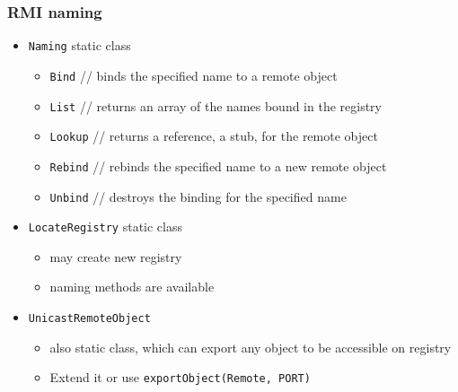 \documentclass[10pt,xcolor=pdflatex]{beamer}
\begin{document}
\begin{frame}[containsverbatim]\frametitle{RMI naming}
\begin{itemize}
	\item \texttt{Naming} static class
	  \begin{itemize}
		\item \texttt{Bind} // binds the specified name to a remote object
		\item \texttt{List} // returns an array of the names bound in the registry
		\item \texttt{Lookup} // returns a reference, a stub, for the remote object
		\item \texttt{Rebind}  // rebinds the specified name to a new remote object
		\item \texttt{Unbind} // destroys the binding for the specified name
	  \end{itemize}
    \item \texttt{LocateRegistry} static class
      \begin{itemize}
    	\item may create new registry
		\item naming methods are available
       \end{itemize}
     \item \texttt{UnicastRemoteObject}
       \begin{itemize}
     	\item also static class, which can export any object to be accessible on registry
        \item Extend it or use \texttt{exportObject(Remote, PORT)}
       \end{itemize}
\end{itemize}
\end{frame}
\end{document}
